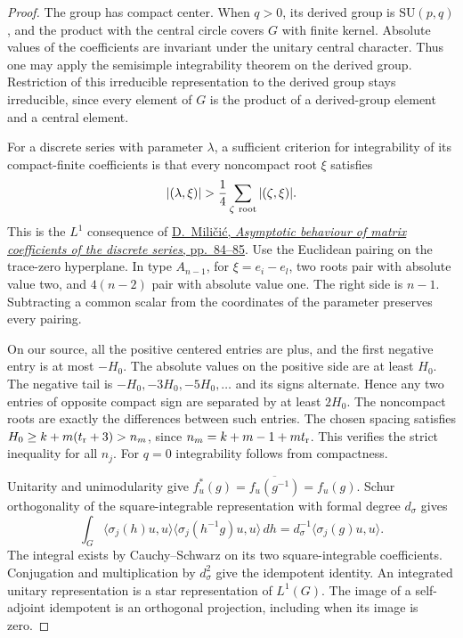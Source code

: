 \documentclass[a4paper,11pt]{article}
\theoremstyle{definition}
\theoremstyle{remark}
\numberwithin{equation}{section}
\begin{document}
\begin{proof}
The group has compact center. When \(q>0\), its derived
group is \(\mathrm{SU}(p,q)\), and the product with the
central circle covers \(G\) with finite kernel.
Absolute values of the coefficients are invariant under
the unitary central character. Thus one may apply the
semisimple integrability theorem on the derived group.
Restriction of this irreducible representation to the derived
group stays irreducible, since every element of \(G\) is the
product of a derived-group element and a central element.

For a discrete series with parameter \(\lambda\), a sufficient
criterion for integrability of its compact-finite coefficients
is that every noncompact root \(\xi\) satisfies
\[
     |(\lambda,\xi)|>\frac14\sum_{\zeta\ {\rm root}}
                                         |(\zeta,\xi)|.
\]
This is the \(L^1\) consequence of
\href{https://www.math.utah.edu/~ptrapa/math-library/milicic/milicic-asymptotics-duke-1977.pdf}{D.~Mili\v ci\'c,
\emph{Asymptotic behaviour of matrix coefficients of the
discrete series}, pp.~84--85}. Use the Euclidean pairing on
the trace-zero hyperplane. In type \(A_{n-1}\), for
\(\xi=e_i-e_l\), two roots pair with absolute value two,
and \(4(n-2)\) pair with absolute value one. The right
side is \(n-1\). Subtracting a common scalar from the
coordinates of the parameter preserves every pairing.

On our source, all the positive centered entries are plus,
and the first negative entry is at most \(-H_0\).
The absolute values on the positive side are at least
\(H_0\). The negative tail is
\(-H_0,-3H_0,-5H_0,\ldots\) and its signs alternate.
Hence any two entries of opposite compact sign are
separated by at least \(2H_0\). The noncompact roots are
exactly the differences between such entries. The chosen
spacing satisfies \(H_0\ge k+m(t_{\rm r}+3)>n_m\),
since \(n_m=k+m-1+mt_{\rm r}\). This verifies the strict
inequality for all \(n_j\). For \(q=0\) integrability
follows from compactness.

Unitarity and unimodularity give \(f_u^*(g)=
\overline{f_u(g^{-1})}=f_u(g)\).
Schur orthogonality of the square-integrable representation
with formal degree \(d_\sigma\) gives
\[
 \int_G\langle\sigma_j(h)u,u\rangle
         \langle\sigma_j(h^{-1}g)u,u\rangle\,dh
              =d_\sigma^{-1}\langle\sigma_j(g)u,u\rangle .
\]
The integral exists by Cauchy--Schwarz on its two
square-integrable coefficients. Conjugation and multiplication
by \(d_\sigma^2\) give the idempotent identity. An integrated
unitary representation is a star representation of \(L^1(G)\).
The image of a self-adjoint idempotent is an orthogonal
projection, including when its image is zero.
\end{proof}
\end{document}
